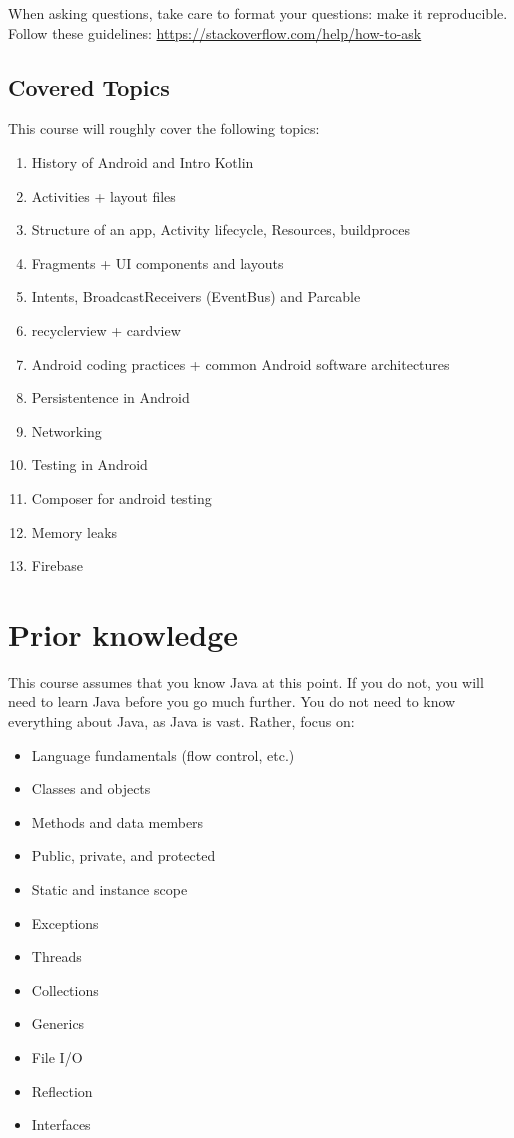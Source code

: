 When asking questions, take care to format your questions: make it reproducible. Follow these guidelines: \href{https://stackoverflow.com/help/how-to-ask}{https://stackoverflow.com/help/how-to-ask}

\subsection{Covered Topics}
This course will roughly cover the following topics:

\begin{enumerate}
	\item History of  Android and Intro Kotlin
	\item Activities + layout files 
	\item Structure of an  app, Activity lifecycle, Resources, buildproces
	\item Fragments + UI components and layouts 
	\item Intents, BroadcastReceivers (EventBus) and Parcable 
	\item recyclerview + cardview 
	\item Android coding practices  + common Android software architectures  
	\item Persistentence in Android
	\item Networking
	\item Testing in Android
	\item Composer for android testing
	\item Memory leaks 
	\item Firebase 
\end{enumerate}

\section{Prior knowledge}
This course assumes that you know Java at this point. If you do not, you will need to learn Java before you go much further. You do not need to know everything about Java, as Java is vast. Rather, focus on:

\begin{itemize}
	\item Language fundamentals (flow control, etc.)
	\item Classes and objects
	\item Methods and data members
	\item Public, private, and protected
	\item Static and instance scope
	\item Exceptions
	\item Threads
	\item Collections
	\item Generics
	\item File I/O
	\item Reflection
	\item Interfaces
\end{itemize}

